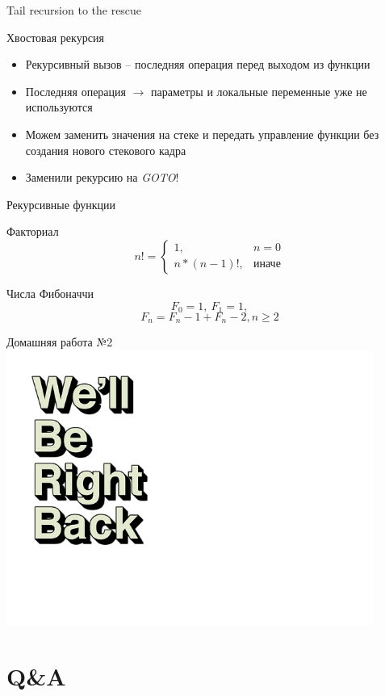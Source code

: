 \documentclass{beamer}
\begin{document}
  \begin{frame}{Tail recursion to the rescue}
    \begin{block}{Хвостовая рекурсия}
        \begin{itemize}
            \item Рекурсивный вызов -- последняя операция перед выходом из функции
            \item Последняя операция $\rightarrow$ параметры и локальные переменные уже не используются
            \item Можем заменить значения на стеке и передать управление функции без создания нового стекового кадра
            \item Заменили рекурсию на \textit{GOTO}!
        \end{itemize}
    \end{block}
  \end{frame}
    \begin{frame}{Рекурсивные функции}
    \begin{block}{Факториал}
      $$ n! = \begin{cases}
			1, & n = 0\\
            n * (n - 1)!, & \text{иначе}
		 \end{cases} $$
	 \end{block}

    \begin{block}{Числа Фибоначчи}
        $$ F_0 = 1,~F_1 = 1, $$
        $$F_n = F_n-1 + F_n-2, n \ge 2$$
    \end{block}
  \end{frame}
  \begin{frame}{Домашняя работа №2}
      \includegraphics[width=12cm]{media/wbrb}
  \end{frame}
  \section{Q\&A}
\end{document}
